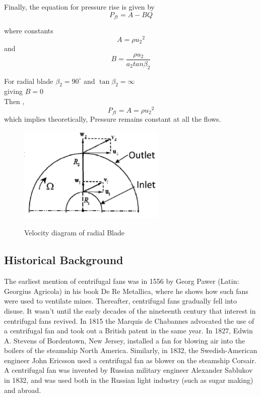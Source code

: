\documentclass[11pt]{article}
\begin{document}
       Finally, the equation for pressure rise is given by
       $$P_{ft}=A-BQ$$
       
       where constants \\$$ A = \rho {u_2}^2$$
       and \\
       $$B=\frac{\rho u_2}{a_2tan\beta_2}$$
       
       For radial blade $\beta_2 = 90^\circ$ and $\tan\beta_2 =\infty$\\
       giving $B=0$\\
       Then ,
       $$P_{ft}=A =\rho {u_2}^2$$
       which implies theoretically, Pressure remains constant at all the flows.\\
\begin{figure}[h!]
\centering
\includegraphics[scale=1]{velocity.png}\\
\caption{Velocity diagram of radial Blade}
\end{figure}
       
 \subsection{Historical Background}
 The earliest mention of centrifugal fans was in 1556 by Georg Pawer (Latin: Georgius Agricola) in his book De Re Metallica, where he shows how such fans were used to ventilate mines. Thereafter, centrifugal fans gradually fell into disuse. It wasn’t until the early decades of the nineteenth century that interest in centrifugal fans revived. In 1815 the Marquis de Chabannes advocated the use of a centrifugal fan and took out a British patent in the same year. In 1827, Edwin A. Stevens of Bordentown, New Jersey, installed a fan for blowing air into the boilers of the steamship North America. Similarly, in 1832, the Swedish-American engineer John Ericsson used a centrifugal fan as blower on the steamship Corsair. A centrifugal fan was invented by Russian military engineer Alexander Sablukov in 1832, and was used both in the Russian light industry (such as sugar making) and abroad.
\end{document}
